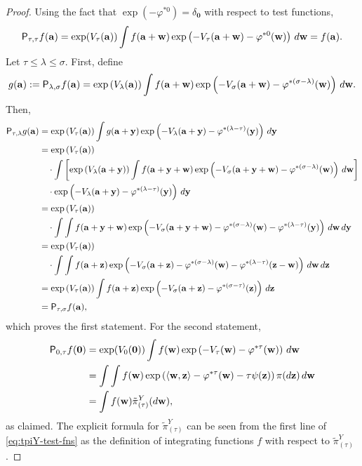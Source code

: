 \documentclass[10pt,a4paper]{amsart}
\newcommand{\Par}[1]{\left(#1\right)}
\newcommand{\dd}{\textup{d}}
\newcommand{\inprod}[2]{\left\langle#1, #2\right\rangle}
\newcommand{\sfP}{\mathsf{P}}
\newcommand{\tpi}{\tilde{\pi}}
\newcommand{\va}{\mathbf{a}}
\newcommand{\vw}{\mathbf{w}}
\newcommand{\vy}{\mathbf{y}}
\newcommand{\vz}{\mathbf{z}}
\begin{document}
\begin{proof}
Using the fact that $\exp\Par{-\varphi^{*0}}=\delta_{\mathbf{0}}$ with respect to test functions, 
\[\sfP_{\tau, \tau}f(\va)=\exp(V_\tau(\va))\int f(\va+\vw)\exp\Par{-V_\tau(\va+\vw)-\varphi^{*0}(\vw)}\,\dd\vw=f(\va).\]
Let $\tau\leq \lambda\leq \sigma$.  First, define
\[
    g(\va):=\sfP_{\lambda, \sigma}f(\va)
    =\exp\Par{V_\lambda(\va)}\int f(\va+\vw)\exp\Par{-V_\sigma(\va+\vw)-\varphi^{*(\sigma-\lambda)}(\vw)}\,\dd\vw.
\]
Then,
\begin{align*}
    \sfP_{\tau, \lambda}g(\va)
    &=\exp\Par{V_\tau(\va)}\int g(\va+\vy)\exp\Par{-V_\lambda(\va+\vy)-\varphi^{*(\lambda-\tau)}(\vy)}\,\dd\vy\\
    &=\exp\Par{V_\tau(\va)}\\
     &\quad  \cdot \int \left[ \exp\Par{V_\lambda(\va+\vy)}\int f(\va+\vy+\vw)\exp\Par{-V_\sigma(\va+\vy+\vw)-\varphi^{*(\sigma-\lambda)}(\vw)}\,\dd\vw  \right]\\
     &\quad \cdot \exp\Par{-V_\lambda(\va+\vy)-\varphi^{*(\lambda-\tau)}(\vy)}\,\dd\vy\\
     &=\exp\Par{V_\tau(\va)}\\
     &\quad \cdot \int\int f(\va+\vy+\vw) \exp\Par{-V_\sigma(\va+\vy+\vw)-\varphi^{*(\sigma-\lambda)}(\vw)-\varphi^{*(\lambda-\tau)}(\vy)}\,\dd\vw\,\dd\vy\\
     &=\exp\Par{V_\tau(\va)}\\
     &\quad \cdot \int\int f(\va+\vz) \exp\Par{-V_\sigma(\va+\vz)-\varphi^{*(\sigma-\lambda)}(\vw)-\varphi^{*(\lambda-\tau)}(\vz-\vw)}\,\dd\vw\,\dd\vz\\
     &=\exp\Par{V_\tau(\va)}\int f(\va+\vz)\exp\Par{-V_\sigma(\va+\vz)-\varphi^{*(\sigma-\tau)}(\vz)}\,\dd\vz\\
     &=\sfP_{\tau, \sigma}f(\va),
\end{align*}
which proves the first statement. For the second statement,
\begin{equation}\label{eq:tpiY-test-fns}
    \begin{aligned}
    \sfP_{0, \tau}f(\mathbf{0})
    &=\exp(V_0(\mathbf{0}))\int f(\vw)\exp\Par{-V_\tau(\vw)-\varphi^{*\tau}(\vw)}\,\dd\vw\\
    &=\int\int  f(\vw)\exp\Par{\inprod{\vw}{\vz}-\varphi^{*\tau}(\vw)-\tau \psi(\vz)}\pi(\dd\vz)\,\dd\vw\\
    &=\int f(\vw)\tpi_{(\tau)}^Y(\dd\vw),
\end{aligned}
\end{equation}
as claimed.  The explicit formula for $\tpi_{(\tau)}^Y$ can be seen from the first line of \eqref{eq:tpiY-test-fns} as the definition of integrating functions $f$ with respect to $\tpi_{(\tau)}^Y$.
\end{proof}
\end{document}
